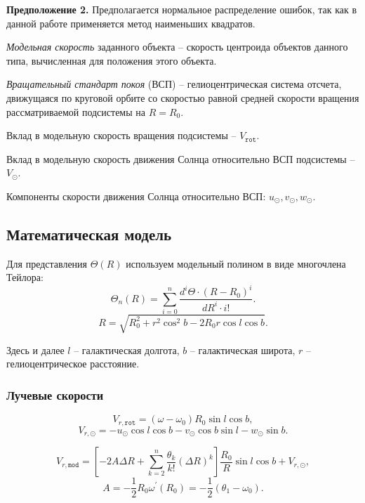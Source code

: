 \documentclass{matmex-diploma-custom}
\begin{document}
\textbf{Предположение 2.}
Предполагается нормальное распределение ошибок, так как в данной работе применяется метод наименьших квадратов.

\textit{Модельная скорость} заданного объекта -- скорость центроида объектов данного типа, вычисленная для положения этого объекта.

\textit{Вращательный стандарт покоя} (ВСП) -- гелиоцентрическая система отсчета, движущаяся по круговой орбите со скоростью равной средней скорости вращения рассматриваемой подсистемы на $R = R_0$.

Вклад в модельную скорость вращения подсистемы -- $V_{\texttt{rot}}$.

Вклад в модельную скорость движения Солнца относительно ВСП подсистемы -- $V_{\odot}$.

Компоненты скорости движения Солнца относительно ВСП: $u_{\odot}, v_{\odot}, w_{\odot}$.


\subsection{Математическая модель}
Для представления $\Theta(R)$ используем модельный полином в виде многочлена Тейлора:
\begin{equation} \label{theta_n}
        \Theta_n(R)=\sum _{i=0}^{n} \frac{d^i\Theta \cdot (R - R_0)^i}{dR^i\cdot i!}.
\end{equation}
\begin{equation}
	R = \sqrt{R_0^2 + r^2 \cos^2{b} - 2R_0 r \cos{l} \cos{b}}.
\end{equation}

Здесь и далее $l$ -- галактическая долгота, $b$ -- галактическая широта, $r$ -- гелиоцентрическое расстояние.
\pagebreak
\subsubsection{Лучевые скорости} \label{def_mod_vr}
\begin{equation}
        V_{r, \texttt{rot}} = (\omega - \omega_0)R_0 \sin{l} \cos{b},
\end{equation}
\begin{equation}
        V_{r, \odot} = -u_{\odot} \cos{l} \cos{b} - v_{\odot} \cos{b} \sin{l} - w_{\odot} \sin{b}.
\end{equation}

\begin{equation}
        V_{r, \texttt{mod}} = \left[ -2A\Delta R + \sum^n_{k = 2} \frac{\theta_k}{k!} \left( \Delta R \right)^k \right] \frac{R_0}{R} \sin{l} \cos{b} + V_{r, \odot},
\end{equation}
\begin{equation}
        A = - \frac{1}{2} R_0 \omega^{'}(R_0) = - \frac{1}{2} (\theta_1 - \omega_0).
\end{equation}
\end{document}
